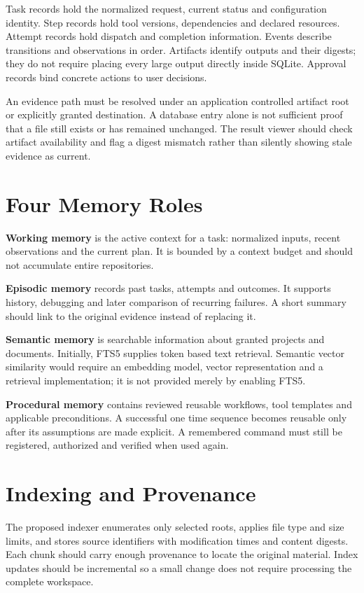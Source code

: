 Task records hold the normalized request, current status and configuration identity. Step records hold tool versions, dependencies and declared resources. Attempt records hold dispatch and completion information. Events describe transitions and observations in order. Artifacts identify outputs and their digests; they do not require placing every large output directly inside SQLite. Approval records bind concrete actions to user decisions.

An evidence path must be resolved under an application controlled artifact root or explicitly granted destination. A database entry alone is not sufficient proof that a file still exists or has remained unchanged. The result viewer should check artifact availability and flag a digest mismatch rather than silently showing stale evidence as current.

\section{Four Memory Roles}
\textbf{Working memory} is the active context for a task: normalized inputs, recent observations and the current plan. It is bounded by a context budget and should not accumulate entire repositories.

\textbf{Episodic memory} records past tasks, attempts and outcomes. It supports history, debugging and later comparison of recurring failures. A short summary should link to the original evidence instead of replacing it.

\textbf{Semantic memory} is searchable information about granted projects and documents. Initially, FTS5 supplies token based text retrieval. Semantic vector similarity would require an embedding model, vector representation and a retrieval implementation; it is not provided merely by enabling FTS5.

\textbf{Procedural memory} contains reviewed reusable workflows, tool templates and applicable preconditions. A successful one time sequence becomes reusable only after its assumptions are made explicit. A remembered command must still be registered, authorized and verified when used again.

\section{Indexing and Provenance}
The proposed indexer enumerates only selected roots, applies file type and size limits, and stores source identifiers with modification times and content digests. Each chunk should carry enough provenance to locate the original material. Index updates should be incremental so a small change does not require processing the complete workspace.

